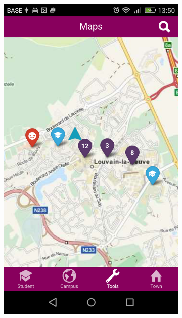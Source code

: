 \documentclass{eplmastersthesis}
\begin{document}
\begin{figure}
\begin{subfigure}[b]{0.3\textwidth}
        \includegraphics[width=\textwidth]{Images/Application_screens/Screenshot_2016-06-06-13-50-28.png}
    \end{subfigure}
\end{figure}
\end{document}
